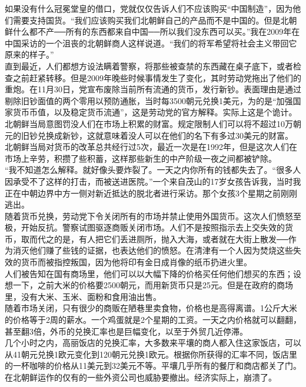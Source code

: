 \begin{multicols}{\theparacolNo}
如果没有什么冠冕堂皇的借口，党就仅仅告诉人们不应该购买“中国制造”，因为他们需要支持国货。“我们应该购买我们北朝鲜自己的产品而不是中国的。但是北朝鲜什么都不产──所有的东西都来自中国──所以我们没东西可以买。”我在2009年在中国采访的一个沮丧的北朝鲜商人这样说道。“我们的将军希望将社会主义带回它原来的样子。”\\

直到最近，人们都想方设法瞒着警察，将那些被查禁的东西藏在桌子底下，或者检查之前赶紧转移。但是2009年晚些时候事情发生了变化，其时劳动党拖出了他们的重炮。在11月30日，党宣布废除当前所有流通的货币，发行新钞。表面理由是通过剔除旧钞面值的两个零用以预防通胀，当时每3500朝元兑换1美元，为的是“加强国家货币币值，以及稳定货币流通”，这是劳动党的官方解释。实际上这是个诡计。北朝鲜当局意图罚没人们在市场上积累的财富。规定限制人们可以将不超过10万朝元的旧钞兑换成新钞，这就意味着没人可以在他们的名下有多过30美元的财富。\\

北朝鲜当局对货币的改革总共经行过5次，最近一次是在1992年，但是这次人们在市场上辛劳，积攒了些积蓄，这样那些新生的中产阶级一夜之间都被铲除。\\

“我不知道怎么解释。就好像头要炸裂了。一天之内你所有的钱都失去了。“很多人因承受不了这样的打击，而被送进医院。”一个来自茂山的17岁女孩告诉我，当时我正在中朝边界中方一侧对新近抵达的脱北者进行采访。那个女孩3个星期之前刚刚逃出。\\

随着货币兑换，劳动党下令关闭所有的市场并禁止使用外国货币。这次人们愤怒至极，开始反抗。警察试图驱逐商贩关闭市场。人们不是按照指示去上交失效的货币，取而代之的是，有人把它们丢进厕所，抛入大海，或者就在大街上散发──作为消灭他们赚了些钱的证据，也表达他们的愤怒。在清津有一个人因为焚烧这些失效的货币而被指控叛国，因为他将印有金日成肖像的纸币扔进火里。\\

人们被告知在国有商场里，他们可以以大幅下降的价格买任何他们想买的东西；设想一下，之前大米的价格要2500朝元，而用新货币只是25元。但是在政府的商场里，没有大米、玉米、面粉和食用油出售。\\

随着市场关闭，只有很少的商贩在陋巷里卖食物，价格也是高得离谱。1公斤大米的价格等于2周的薪水。一个鸡蛋就是2个星期的工资。一天之内价格就可以翻翻，甚至翻3倍，外币的兑换汇率也是巨幅变化，以至于外贸几近停滞。\\

几个小时之内，高丽饭店的兑换汇率，大多数来平壤的商人都入住这家饭店，可以从41朝元兑换1欧元变化到120朝元兑换1欧元。根据你所获得的汇率不同，饭店里的一杯咖啡的价格从11美元到32美元不等。平壤几乎所有的餐厅和商店都关了门。在北朝鲜运作的仅有的一些外资公司也威胁要撤出。经济实际上，崩溃了。\\


\end{multicols}
